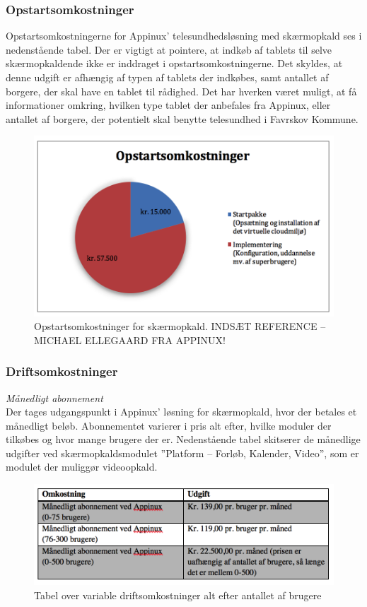 \subsubsection{Opstartsomkostninger}
Opstartsomkostningerne for Appinux’ telesundhedsløsning med skærmopkald ses i nedenstående tabel. Der er vigtigt at pointere, at indkøb af tablets til selve skærmopkaldende ikke er inddraget i opstartsomkostningerne. Det skyldes, at denne udgift er afhængig af typen af tablets der indkøbes, samt antallet af borgere, der skal have en tablet til rådighed. 
Det har hverken været muligt, at få informationer omkring, hvilken type tablet der anbefales fra Appinux, eller antallet af borgere, der potentielt skal benytte telesundhed i Favrskov Kommune.

\begin{figure}[H]
	\centering
	\includegraphics[width=1\textwidth]{Figurer/Snip20160504_26}
	\caption{Opstartsomkostninger for skærmopkald. INDSÆT REFERENCE – MICHAEL ELLEGAARD FRA APPINUX!}
\end{figure}

\subsubsection{Driftsomkostninger}
\textit{Månedligt abonnement}\\
Der tages udgangspunkt i Appinux’ løsning for skærmopkald, hvor der betales et månedligt beløb. Abonnementet varierer i pris alt efter, hvilke moduler der tilkøbes og hvor mange brugere der er. 
Nedenstående tabel skitserer de månedlige udgifter ved skærmopkaldsmodulet ”Platform – Forløb, Kalender, Video”, som er modulet der muliggør videoopkald.

\begin{figure}[H]
	\centering
	\includegraphics[width=1\textwidth]{Figurer/Snip20160504_27}
	\caption{Tabel over variable driftsomkostninger alt efter antallet af brugere}
\end{figure}

